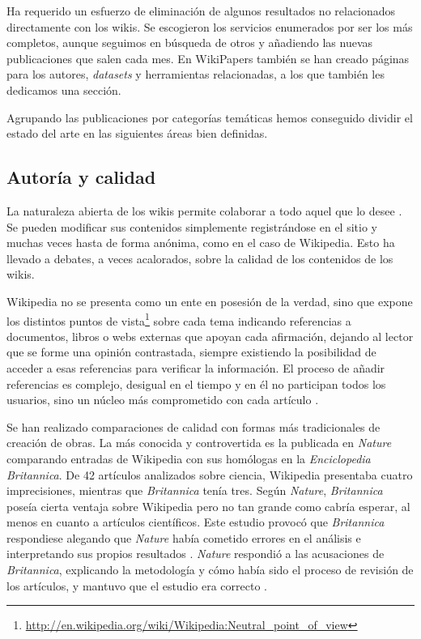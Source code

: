 \documentclass[11pt,onecolumn]{article}
\begin{document}
Ha requerido un esfuerzo de eliminación de algunos resultados no relacionados directamente con los wikis. Se escogieron los servicios enumerados por ser los más completos, aunque seguimos en búsqueda de otros y añadiendo las nuevas publicaciones que salen cada mes. En WikiPapers también se han creado páginas para los autores, \emph{datasets} y herramientas relacionadas, a los que también les dedicamos una sección.

Agrupando las publicaciones por categorías temáticas hemos conseguido dividir el estado del arte en las siguientes áreas bien definidas.

\subsection{Autoría y calidad}


La naturaleza abierta de los wikis permite colaborar a todo aquel que lo desee \citep{ward2001}. Se pueden modificar sus contenidos simplemente registrándose en el sitio y muchas veces hasta de forma anónima, como en el caso de Wikipedia. Esto ha llevado a debates, a veces acalorados, sobre la calidad de los contenidos de los wikis.

Wikipedia no se presenta como un ente en posesión de la verdad, sino que expone los distintos puntos de vista\footnote{\href{http://en.wikipedia.org/wiki/Wikipedia:Neutral_point_of_view}{http://en.wikipedia.org/wiki/Wikipedia:Neutral\_point\_of\_view}} sobre cada tema indicando referencias a documentos, libros o webs externas que apoyan cada afirmación, dejando al lector que se forme una opinión contrastada, siempre existiendo la posibilidad de acceder a esas referencias para verificar la información. El proceso de añadir referencias es complejo, desigual en el tiempo y en él no participan todos los usuarios, sino un núcleo más comprometido con cada artículo \citep{chen2012}.

Se han realizado comparaciones de calidad con formas más tradicionales de creación de obras. La más conocida y controvertida es la publicada en \emph{Nature} \citep{giles2005} comparando entradas de Wikipedia con sus homólogas en la \emph{Enciclopedia Britannica}. De 42 artículos analizados sobre ciencia, Wikipedia presentaba cuatro imprecisiones, mientras que \emph{Britannica} tenía tres. Según \emph{Nature}, \emph{Britannica} poseía cierta ventaja sobre Wikipedia pero no tan grande como cabría esperar, al menos en cuanto a artículos científicos. Este estudio provocó que \emph{Britannica} respondiese alegando que \emph{Nature} había cometido errores en el análisis e interpretando sus propios resultados \citep{britannica2006}. \emph{Nature} respondió a las acusaciones de \emph{Britannica}, explicando la metodología y cómo había sido el proceso de revisión de los artículos, y mantuvo que el estudio era correcto \citep{nature2006}.
\end{document}

